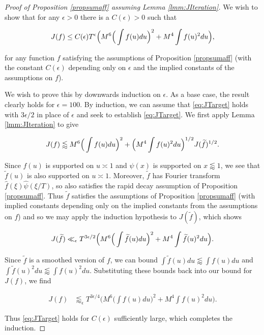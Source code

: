 \documentclass{amsart}
\theoremstyle{plain}
\numberwithin{equation}{section}
\renewcommand{\tilde}{\widetilde}
\begin{document}
\begin{proof}[Proof of Proposition \ref{propsumaff} assuming Lemma \ref{lmm:JIteration}]
We wish to show that for any $\epsilon>0$ there is a $C(\epsilon)>0$ such that

\begin{equation}
J(f)\le C(\epsilon)T^\epsilon \Bigl( M^6 \Big( \int f(u) du \Big)^2 + M^4 \int f(u)^2 du\Bigr),
\label{eq:JTarget}
\end{equation}

for any function $f$ satisfying the assumptions of Proposition \ref{propsumaff} (with the constant $C(\epsilon)$ depending only on $\epsilon$ and the implied constants of the assumptions on $f$). 

We wish to prove this by downwards induction on $\epsilon$. As a base case, the result clearly holds for $\epsilon=100$. By induction, we can assume that \eqref{eq:JTarget} holds with $3\epsilon/2$ in place of $\epsilon$ and seek to establish \eqref{eq:JTarget}. We first apply Lemma \ref{lmm:JIteration} to give

\[
J(f)\lessapprox M^6 \Big( \int f(u) du \Big)^2 + \Bigl(M^4 \int f(u)^2 du\Bigr)^{1/2}J(\tilde{f})^{1/2}.
\]

Since $f(u)$ is supported on $u\asymp 1$ and $\psi(x)$ is supported on $x\lessapprox 1$, we see that $\tilde{f}(u)$ is also supported on $u\asymp 1$. Moreover, $\tilde{f}$ has Fourier transform $\widehat{f}(\xi)\widehat{\psi}(\xi/T)$, so also satisfies the rapid decay assumption of Proposition \ref{propsumaff}. Thus $\tilde{f}$ satisfies the assumptions of Proposition \ref{propsumaff} (with implied constants depending only on the implied constants from the assumptions on $f$) and so we may apply the induction hypothesis to $J(\tilde{f})$, which shows

\[
J(\tilde{f})\ll_\epsilon T^{3\epsilon/2}\Bigl( M^6 \Big( \int \tilde{f}(u)  du\Big)^2 + M^4 \int \tilde{f}(u)^2 du\Bigr).
\]

Since $\tilde{f}$ is a smoothed version of $f$, we can bound $\int \tilde{f}(u) du \lessapprox \int f(u) du$ and $\int \tilde{f}(u)^2 du \lessapprox \int f(u)^2 du$. Substituting these bounds back into our bound for $J(f)$, we find

\begin{align*}
 J(f)&\lessapprox_\epsilon T^{3\epsilon/4}\Biggl(M^6 \Big( \int f(u)  du\Big)^2+M^4 \int f(u)^2 du\Biggr).
 \end{align*}
 
Thus \eqref{eq:JTarget} holds for $C(\epsilon)$ sufficiently large, which completes the induction.
\end{proof}
\end{document}
